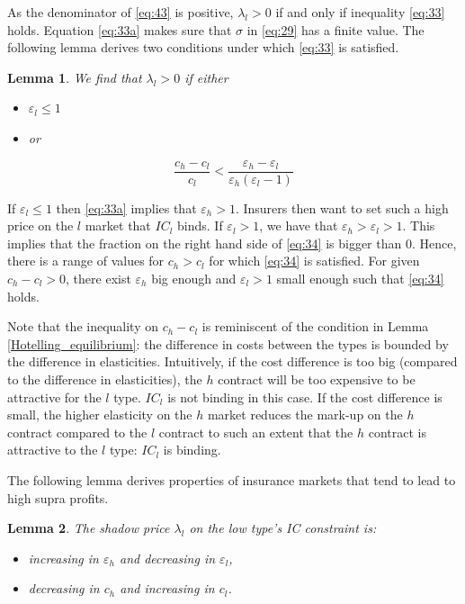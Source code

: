 \documentclass[12pt,english,a4paper]{article}
\newtheorem{lemma}{Lemma}
\begin{document}
As the denominator of \eqref{eq:43} is positive, \(\lambda_l >0\) if and only if inequality \eqref{eq:33} holds. Equation \eqref{eq:33a} makes sure that \(\sigma\) in \eqref{eq:29} has a finite value. The following lemma derives two conditions under which \eqref{eq:33} is satisfied.

\begin{lemma}
\label{IC_l_binding}
We find that \(\lambda_l >0\) if either
\begin{itemize}
\item \(\varepsilon_l \leq 1\)
\item or
\end{itemize}
\begin{equation}
\label{eq:34}
\frac{c_h-c_l}{c_l} < \frac{\varepsilon_h - \varepsilon_l}{\varepsilon_h (\varepsilon_l -1)}
\end{equation}
\end{lemma}

If \(\varepsilon_l \leq 1\) then \eqref{eq:33a} implies that \(\varepsilon_h > 1\). Insurers then want to set such a high price on the \(l\) market that \(IC_l\) binds. If \(\varepsilon_l > 1\), we have that \(\varepsilon_h > \varepsilon_l>1\). This implies that the fraction on the right hand side of \eqref{eq:34} is bigger than 0. Hence, there is a range of values for \(c_h>c_l\) for which \eqref{eq:34} is satisfied. For given \(c_h-c_l>0\), there exist \(\varepsilon_h\) big enough and \(\varepsilon_l>1\) small enough such that \eqref{eq:34} holds.

Note that the inequality on \(c_h-c_l\) is reminiscent of the condition in Lemma \ref{Hotelling_equilibrium}: the difference in costs between the types is bounded by the difference in elasticities. Intuitively, if the cost difference is too big (compared to the difference in elasticities), the \(h\) contract will be too expensive to be attractive for the \(l\) type. \(IC_l\) is not binding in this case. If the cost difference is small, the higher elasticity on the \(h\) market reduces the mark-up on the \(h\) contract compared to the \(l\) contract to such an extent that the \(h\) contract is attractive to the \(l\) type: \(IC_l\) is binding.

The following lemma derives properties of insurance markets that tend to lead to high supra profits.

\begin{lemma}
\label{Comparative_static_lambda}
The shadow price \(\lambda_l\) on the low type's IC constraint is:
\begin{itemize}
\item increasing in \(\varepsilon_h\) and decreasing in \(\varepsilon_l\),
\item decreasing in \(c_h\) and increasing in \(c_l\).
\end{itemize}
\end{lemma}
\end{document}
